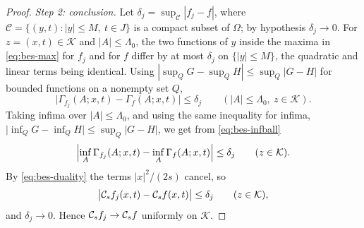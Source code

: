 \begin{proof}
\emph{Step 2: conclusion.}
Let $\delta_j=\sup_{\mathcal C}|f_j-f|$, where
$\mathcal C=\{(y,t):|y|\le M,\ t\in J\}$ is a compact subset of $\Omega$; by
hypothesis $\delta_j\to0$. For $z=(x,t)\in\mathcal K$ and $|A|\le\Lambda_0$, the
two functions of $y$ inside the maxima in \eqref{eq:bes-max} for $f_j$ and for
$f$ differ by at most $\delta_j$ on $\{|y|\le M\}$, the quadratic and linear
terms being identical. Using $|\sup_QG-\sup_QH|\le\sup_Q|G-H|$ for bounded
functions on a nonempty set $Q$,
\[
  \bigl|\Gamma_{f_j}(A;x,t)-\Gamma_f(A;x,t)\bigr|\le\delta_j
  \qquad(|A|\le\Lambda_0,\ z\in\mathcal K).
\]
Taking infima over $|A|\le\Lambda_0$, and using the same inequality for infima,
$\bigl|\inf_QG-\inf_QH\bigr|\le\sup_Q|G-H|$, we get from
\eqref{eq:bes-infball}
\[
  \Bigl|\inf_{A}\Gamma_{f_j}(A;x,t)-\inf_A\Gamma_f(A;x,t)\Bigr|\le\delta_j
  \qquad(z\in\mathcal K).
\]
By \eqref{eq:bes-duality} the terms $|x|^2/(2s)$ cancel, so
\[
  \bigl|\mathcal{C}_sf_j(x,t)-\mathcal{C}_sf(x,t)\bigr|\le\delta_j
  \qquad(z\in\mathcal K),
\]
and $\delta_j\to0$. Hence $\mathcal{C}_sf_j\to\mathcal{C}_sf$ uniformly on $\mathcal K$.
\end{proof}
